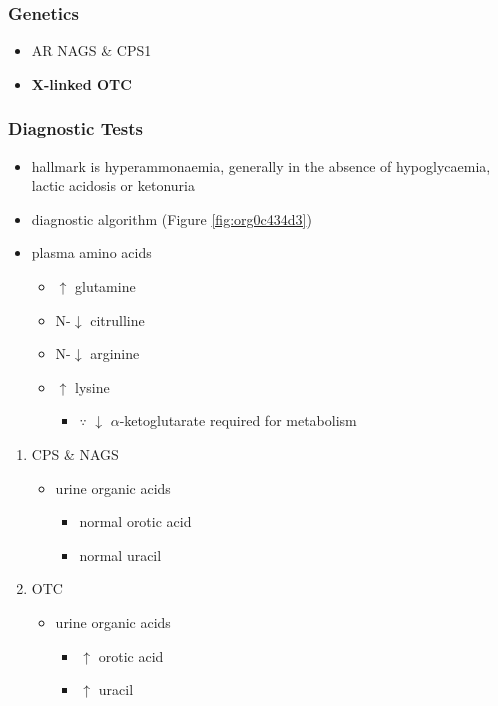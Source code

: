 \documentclass[12pt]{scrartcl}
\begin{document}
\begin{center}
\begin{center}
\subsubsection{Genetics}
\label{sec:org3e5d146}
\begin{itemize}
\item AR NAGS \& CPS1
\item \textbf{X-linked OTC}
\end{itemize}

\subsubsection{Diagnostic Tests}
\label{sec:orgbcc9a14}
\begin{itemize}
\item hallmark is hyperammonaemia, generally in the absence of
hypoglycaemia, lactic acidosis or ketonuria
\item diagnostic algorithm (Figure \ref{fig:org0c434d3})
\item plasma amino acids
\begin{itemize}
\item \(\uparrow\) glutamine
\item N-\(\downarrow\) citrulline
\item N-\(\downarrow\) arginine
\item \(\uparrow\) lysine
\begin{itemize}
\item \(\because\) \(\downarrow\) \(\alpha\)-ketoglutarate required for metabolism
\end{itemize}
\end{itemize}
\end{itemize}
\begin{enumerate}
\item CPS \& NAGS
\label{sec:org39058df}
\begin{itemize}
\item urine organic acids
\begin{itemize}
\item normal orotic acid
\item normal uracil
\end{itemize}
\end{itemize}
\item OTC
\label{sec:org431a45f}
\begin{itemize}
\item urine organic acids
\begin{itemize}
\item \(\uparrow\) orotic acid
\item \(\uparrow\) uracil
\end{itemize}
\end{itemize}
\end{enumerate}



\end{center}
\end{center}
\end{document}
